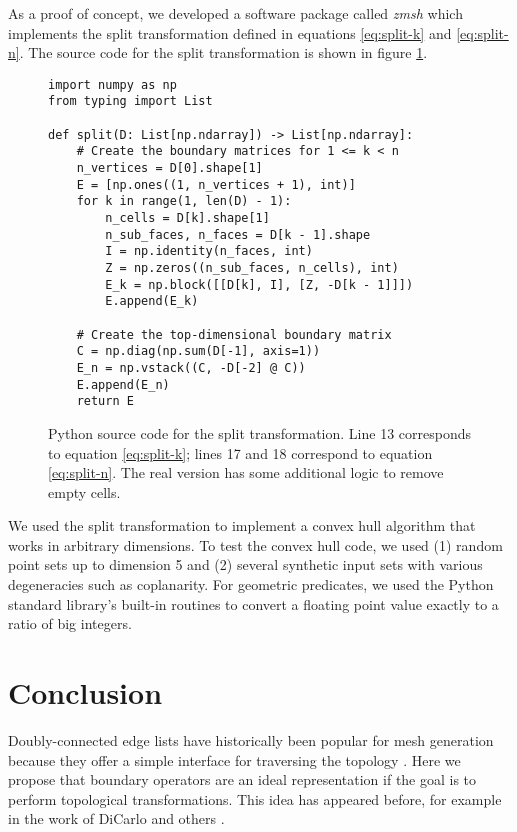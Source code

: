 \documentclass[twocolumn]{article}
\begin{document}
As a proof of concept, we developed a software package called \emph{zmsh}
which implements the split transformation defined in equations \eqref{eq:split-k} and \eqref{eq:split-n}.
The source code for the split transformation is shown in figure \ref{fig:split-source-code}.
\begin{figure}
    \begin{verbatim}
import numpy as np
from typing import List

def split(D: List[np.ndarray]) -> List[np.ndarray]:
    # Create the boundary matrices for 1 <= k < n
    n_vertices = D[0].shape[1]
    E = [np.ones((1, n_vertices + 1), int)]
    for k in range(1, len(D) - 1):
        n_cells = D[k].shape[1]
        n_sub_faces, n_faces = D[k - 1].shape
        I = np.identity(n_faces, int)
        Z = np.zeros((n_sub_faces, n_cells), int)
        E_k = np.block([[D[k], I], [Z, -D[k - 1]]])
        E.append(E_k)

    # Create the top-dimensional boundary matrix
    C = np.diag(np.sum(D[-1], axis=1))
    E_n = np.vstack((C, -D[-2] @ C))
    E.append(E_n)
    return E
    \end{verbatim}
    \caption{Python source code for the split transformation.
    Line 13 corresponds to equation \eqref{eq:split-k}; lines 17 and 18 correspond to equation \eqref{eq:split-n}.
    The real version has some additional logic to remove empty cells.}
    \label{fig:split-source-code}
\end{figure}
We used the split transformation to implement a convex hull algorithm that works in arbitrary dimensions.
To test the convex hull code, we used (1) random point sets up to dimension 5 and (2) several synthetic input sets with various degeneracies such as coplanarity.
For geometric predicates, we used the Python standard library's built-in routines to convert a floating point value exactly to a ratio of big integers.


\section{Conclusion}

Doubly-connected edge lists have historically been popular for mesh generation because they offer a simple interface for traversing the topology \cite{guibas1985primitives}.
Here we propose that boundary operators are an ideal representation if the goal is to perform topological transformations.
This idea has appeared before, for example in the work of DiCarlo and others \cite{dicarlo2007solid}.
\end{document}
